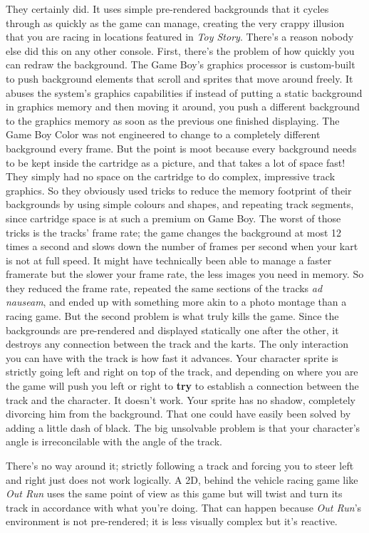 \documentclass{book}
\begin{document}
They certainly did. It uses simple pre-rendered backgrounds that it cycles through as quickly as the game can manage, creating the very crappy illusion that you are racing in locations featured in \emph{Toy Story}. There’s a reason nobody else did this on any other console. First, there’s the problem of how quickly you can redraw the background. The Game Boy’s graphics processor is custom-built to push background elements that scroll and sprites that move around freely. It abuses the system’s graphics capabilities if instead of putting a static background in graphics memory and then moving it around, you push a different background to the graphics memory as soon as the previous one finished displaying. The Game Boy Color was not engineered to change to a completely different background every frame. But the point is moot because every background needs to be kept inside the cartridge as a picture, and that takes a lot of space fast! They simply had no space on the cartridge to do complex, impressive track graphics. So they obviously used tricks to reduce the memory footprint of their backgrounds by using simple colours and shapes, and repeating track segments, since cartridge space is at such a premium on Game Boy. The worst of those tricks is the tracks’ frame rate; the game changes the background at most 12 times a second and slows down the number of frames per second when your kart is not at full speed. It might have technically been able to manage a faster framerate but the slower your frame rate, the less images you need in memory. So they reduced the frame rate, repeated the same sections of the tracks \emph{ad nauseam}, and ended up with something more akin to a photo montage than a racing game. But the second problem is what truly kills the game. Since the backgrounds are pre-rendered and displayed statically one after the other, it destroys any connection between the track and the karts. The only interaction you can have with the track is how fast it advances. Your character sprite is strictly going left and right on top of the track, and depending on where you are the game will push you left or right to \textbf{try} to establish a connection between the track and the character. It doesn’t work. Your sprite has no shadow, completely divorcing him from the background. That one could have easily been solved by adding a little dash of black. The big unsolvable problem is that your character’s angle is irreconcilable with the angle of the track.\par
There’s no way around it; strictly following a track and forcing you to steer left and right just does not work logically. A 2D, behind the vehicle racing game like \emph{Out Run} uses the same point of view as this game but will twist and turn its track in accordance with what you’re doing. That can happen because \emph{Out Run}’s environment is not pre-rendered; it is less visually complex but it’s reactive.\par
\end{document}

